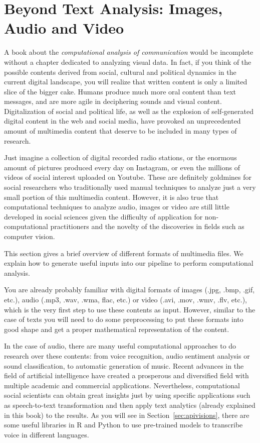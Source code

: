 %
\section{Beyond Text Analysis: Images, Audio and Video}
\label{sec:beyond}

A book about the \textit{computational analysis of communication} would be incomplete without a chapter dedicated to analyzing visual data.
In fact, if you think of the possible contents derived from social, cultural and political dynamics in the current digital landscape, you will realize that written content is only a limited slice of the bigger cake. Humans produce much more oral content than text messages, and are more agile in deciphering sounds and visual content. Digitalization of social and political life, as well as the explosion of self-generated digital content in the web and social media, have provoked an unprecedented amount of multimedia content that deserve to be included in many types of research.

Just imagine a collection of digital recorded radio stations, or the enormous amount of pictures produced every day on Instagram, or even the millions of videos of social interest uploaded on Youtube. These are definitely goldmines for social researchers who traditionally used manual techniques to analyze just a very small portion of this multimedia content. However, it is also true that computational techniques to analyze audio, images or video are still little developed in social sciences given the difficulty of application for non-computational practitioners and the novelty of the discoveries in fields such as computer vision.

This section gives a brief overview of different formats of multimedia files. We explain how to generate useful inputs into our pipeline to perform computational analysis.

You are already probably familiar with digital formats of images (.jpg, .bmp, .gif, etc.), audio (.mp3, .wav, .wma, flac, etc.) or video (.avi, .mov, .wmv, .flv, etc.), which is the very first step to use these contents as input. However, similar to the case of texts you will need to do some preprocessing to put these formats into good shape and get a proper mathematical representation of the content.

In the case of audio, there are many useful computational approaches to do research over these contents: from voice recognition, audio sentiment analysis or sound classification, to automatic generation of music. Recent advances in the field of artificial intelligence have created a prosperous and diversified field with multiple academic and commercial applications. Nevertheless, computational social scientists can obtain great insights just by using specific applications such as speech-to-text transformation and then apply text analytics (already explained in this book) to the results. As you will see in Section~\ref{sec:apivisions}, there are some useful libraries in R and Python to use pre-trained models to transcribe voice in different languages.

